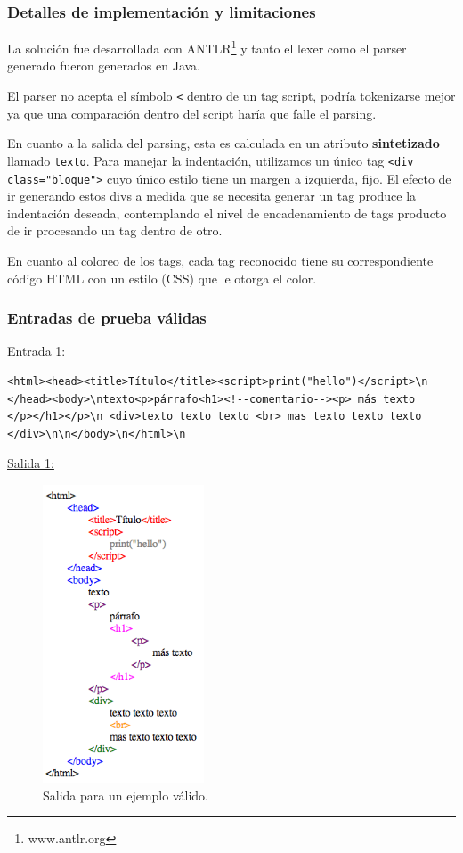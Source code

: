 \newpage
\subsubsection{Detalles de implementación y limitaciones}
La solución fue desarrollada con ANTLR\footnote{www.antlr.org} y tanto el lexer como el parser generado fueron generados en Java.

El parser no acepta el símbolo \verb|<| dentro de un tag script, podría tokenizarse mejor ya que una comparación dentro del script haría que falle el parsing.

En cuanto a la salida del parsing, esta es calculada en un atributo \textbf{sintetizado} llamado \texttt{texto}. Para manejar la indentación, utilizamos un único tag \verb|<div class="bloque">| cuyo único estilo tiene un margen a izquierda, fijo. El efecto de ir generando estos divs a medida que se necesita generar un tag produce la indentación deseada, contemplando el nivel de encadenamiento de tags producto de ir procesando un tag dentro de otro.

En cuanto al coloreo de los tags, cada tag reconocido tiene su correspondiente código HTML con un estilo (CSS) que le otorga el color.

\subsubsection{Entradas de prueba válidas}

\underline{Entrada 1:}
\begin{verbatim}
<html><head><title>Título</title><script>print("hello")</script>\n
</head><body>\ntexto<p>párrafo<h1><!--comentario--><p> más texto
</p></h1></p>\n <div>texto texto texto <br> mas texto texto texto
</div>\n\n</body>\n</html>\n\end{verbatim}

\underline{Salida 1:}

\begin{figure}[h!]
\includegraphics[width=4.8cm]{img/ejemplo1.png}
      \caption{Salida para un ejemplo válido.}
      \label{salida1}
\end{figure}

